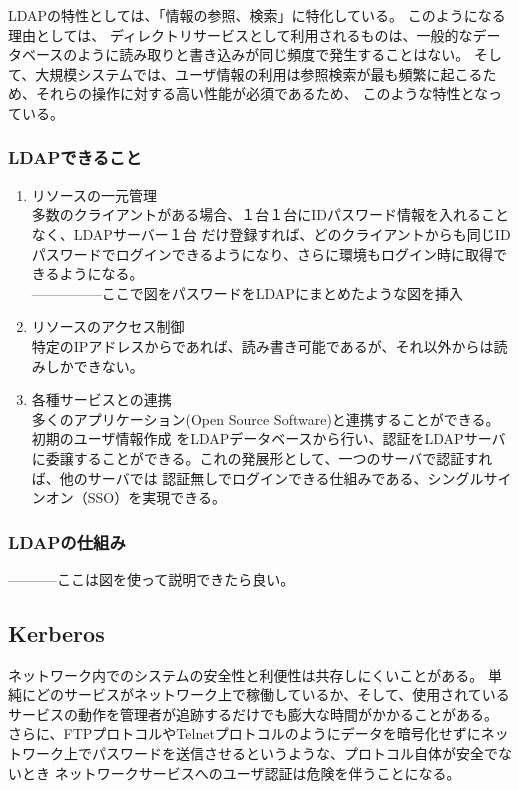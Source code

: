 \documentclass[12pt,a4paper,titlepage]{jsarticle}
\begin{document}
LDAPの特性としては、「情報の参照、検索」に特化している。
このようになる理由としては、
ディレクトリサービスとして利用されるものは、一般的なデータベースのように読み取りと書き込みが同じ頻度で発生することはない。
そして、大規模システムでは、ユーザ情報の利用は参照検索が最も頻繁に起こるため、それらの操作に対する高い性能が必須であるため、
このような特性となっている。


\subsubsection*{LDAPできること}
\begin{enumerate}
    \item リソースの一元管理\mbox{}\\多数のクライアントがある場合、１台１台にIDパスワード情報を入れることなく、LDAPサーバー１台
だけ登録すれば、どのクライアントからも同じIDパスワードでログインできるようになり、さらに環境もログイン時に取得できるようになる。
\\---------------ここで図をパスワードをLDAPにまとめたような図を挿入
    \item リソースのアクセス制御\mbox{}\\特定のIPアドレスからであれば、読み書き可能であるが、それ以外からは読みしかできない。
    \item 各種サービスとの連携\mbox{}\\多くのアプリケーション(Open Source Software)と連携することができる。初期のユーザ情報作成
をLDAPデータベースから行い、認証をLDAPサーバに委譲することができる。これの発展形として、一つのサーバで認証すれば、他のサーバでは
認証無しでログインできる仕組みである、シングルサインオン（SSO）を実現できる。
\end{enumerate}

\subsubsection*{LDAPの仕組み}
-----------ここは図を使って説明できたら良い。

\subsection{Kerberos}
ネットワーク内でのシステムの安全性と利便性は共存しにくいことがある。
単純にどのサービスがネットワーク上で稼働しているか、そして、使用されているサービスの動作を管理者が追跡するだけでも膨大な時間がかかることがある。
さらに、FTPプロトコルやTelnetプロトコルのようにデータを暗号化せずにネットワーク上でパスワードを送信させるというような、プロトコル自体が安全でないとき
ネットワークサービスへのユーザ認証は危険を伴うことになる。
\end{document}
